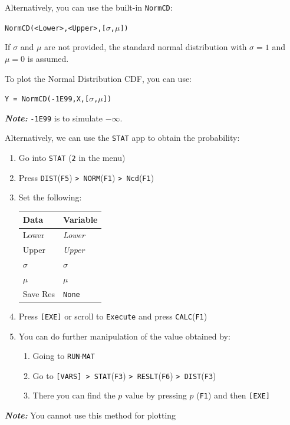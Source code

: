 \documentclass[a5paper,draft]{memoir}
\def\code#1{\texttt{#1}}
\def\note#1{\textbf{\textit{Note:}} #1}
\def\runmat{\code{RUN$\cdot$MAT} }
\def\Fone{(\code{F1}) }
\def\Fthree{(\code{F3}) }
\def\Ffive{(\code{F5}) }
\def\Fsix{(\code{F6}) }
\def\fone{(\code{F1})}
\newcommand{\addtoindex}[1]{#1\index{#1}}
\begin{document}
Alternatively, you can use the built-in \code{\addtoindex{NormCD}}:
\begin{center}
	\code{NormCD(<Lower>,<Upper>,[$\sigma$,$\mu$])}
\end{center}

If $\sigma$ and $\mu$ are not provided, the standard normal distribution with $\sigma=1$ and $\mu=0$ is assumed.

To plot the Normal Distribution CDF, you can use:
\begin{center}
	\code{Y = NormCD(-1E99,X,[$\sigma$,$\mu$])}
\end{center}

\note{\code{-1E99} is to simulate $-\infty$.}

Alternatively, we can use the \code{STAT} app to obtain the probability:
\begin{enumerate}
	\item Go into \code{STAT} (\code{2} in the menu)
	\item Press \code{DIST}\Ffive\code{> NORM}\Fone\code{> Ncd}\fone
	\item Set the following:
	\begin{center}
		\setlength{\tabcolsep}{10pt}
		\renewcommand{\arraystretch}{1.2}
		\begin{tabular}{|l|l|}
			\hline
			Data		& Variable \\
			\hline
			Lower		& \textit{Lower} \\
			\hline
			Upper		& \textit{Upper} \\
			\hline
			$\sigma$	& $\sigma$ \\
			\hline
			$\mu$		& $\mu$ \\
			\hline
			Save Res	& \code{None} \\
			\hline
		\end{tabular}
	\end{center}
	\item Press \code{[EXE]} or scroll to \code{Execute} and press \code{CALC}\Fone
	\item You can do further manipulation of the value obtained by:
	\begin{enumerate}
		\item Going to \runmat
		\item Go to \code{[VARS] > STAT}\Fthree \code{> RESLT}\Fsix\code{> DIST}\Fthree
		\item There you can find the $p$ value by pressing $p$ \Fone and then \code{[EXE]}
	\end{enumerate} 
\end{enumerate}
\note{You cannot use this method for plotting}
\end{document}
